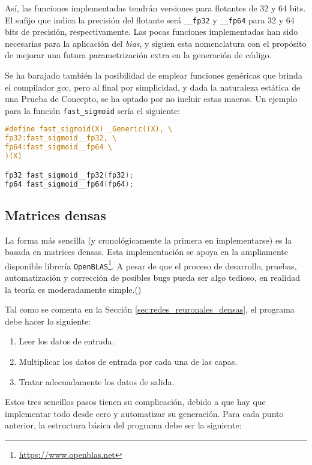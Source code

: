 Así, las funciones implementadas tendrán versiones para flotantes de 32 y 64 bits. El sufijo que indica la precisión del flotante será \texttt{\_\_fp32} y \texttt{\_\_fp64} para 32 y 64 bits de precisión, respectivamente. Las pocas funciones implementadas han sido necesarias para la aplicación del \textit{bias}, y siguen esta nomenclatura con el propósito de mejorar una futura parametrización extra en la generación de código.

Se ha barajado también la posibilidad de emplear funciones genéricas que brinda el compilador gcc, pero al final por simplicidad, y dada la naturaleza estática de una Prueba de Concepto, se ha optado por no incluir estas macros. Un ejemplo para la función \texttt{fast\_sigmoid} sería el siguiente:\medskip
\begin{lstlisting}[language=C]
#define fast_sigmoid(X) _Generic((X), \
fp32:fast_sigmoid__fp32, \
fp64:fast_sigmoid__fp64 \
)(X)

fp32 fast_sigmoid__fp32(fp32);
fp64 fast_sigmoid__fp64(fp64);
\end{lstlisting}


\subsection{Matrices densas}
\label{ssec:gdin_matrices_densas}
La forma más sencilla (y cronológicamente la primera en implementarse) es la basada en matrices densas. Esta implementación se apoya en la ampliamente disponible librería \texttt{OpenBLAS}\footnote{\url{https://www.openblas.net}}. A pesar de que el proceso de desarrollo, pruebas, automatización y corrección de posibles bugs pueda ser algo tedioso, en realidad la teoría es moderadamente simple.()

Tal como se comenta en la Sección \ref{sec:redes_reuronales_densas}, el programa debe hacer lo siguiente:

\begin{enumerate}
    \item Leer los datos de entrada.
    \item Multiplicar los datos de entrada por cada una de las capas.
    \item Tratar adecuadamente los datos de salida.
\end{enumerate}

Estos tres sencillos pasos tienen su complicación, debido a que hay que implementar todo desde cero y automatizar su generación. Para cada punto anterior, la estructura básica del programa debe ser la siguiente:

